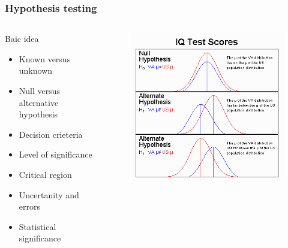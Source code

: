 \documentclass[10pt, compress]{beamer}
\begin{document}
\begin{frame}
    \frametitle{Hypothesis testing}
    \begin{columns}
        \begin{block}{Baic idea}
            \begin{itemize}
                \item Known versus unknown
                \item Null versus alternative hypothesis
                \item Decision crieteria
                \item Level of significance
                \item Critical region
                \item Uncertanity and errors
                \item Statistical significance
            \end{itemize}
        \end{block}
        \begin{block}{}
            \begin{figure}
                \begin{center}
                    \includegraphics[scale=0.3]{img/IQ_Hypoth.png}
                \end{center}
            \end{figure}
        \end{block}
    \end{columns}
\end{frame}
\end{document}
